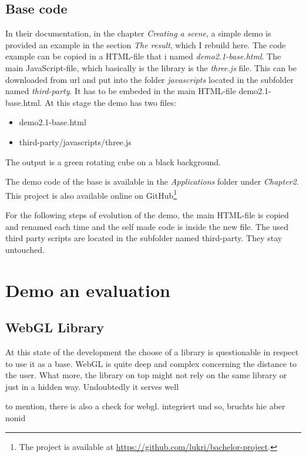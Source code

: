 \subsection*{Base code}
In their documentation, in the chapter \emph{Creating a scene}, a simple demo is provided an example in the section \emph{The result}, which I rebuild here. The code example can be copied in a HTML-file that i named \emph{demo2.1-base.html}. The main JavaScript-file, which basically is the library is the \emph{three.js} file. This can be downloaded from url and put into the folder \emph{javascripts} located in the subfolder named \emph{third-party}. It has to be embeded in the main HTML-file demo2.1-base.html. At this stage the demo has two files:
\begin{itemize}
    \item demo2.1-base.html
    \item third-party/javascripts/three.js
\end{itemize}
\noindent
The output is a green rotating cube on a black background.

The demo code of the base is available in the \emph{Applications}
folder under \emph{Chapter2}. This project is also available online on GitHub\footnote{The project is available at \url{https://github.com/lukri/bachelor-project}.} 

For the following steps of evolution of the demo, the main HTML-file is copied and renamed each time and the self made code is inside the new file. The used third party scripts are located in the subfolder named third-party. They stay untouched.




 

\section{Demo an evaluation}

\subsection*{WebGL Library}

At this state of the development the choose of a library is questionable in respect to use it as a base. WebGL is quite deep and complex concerning the distance to the user. What more, the library on top might not rely on the same library or just in a hidden way.
Undoubtedly it serves well 


to mention, there is also a check for webgl. integriert und so, bruchts hie aber nonid



